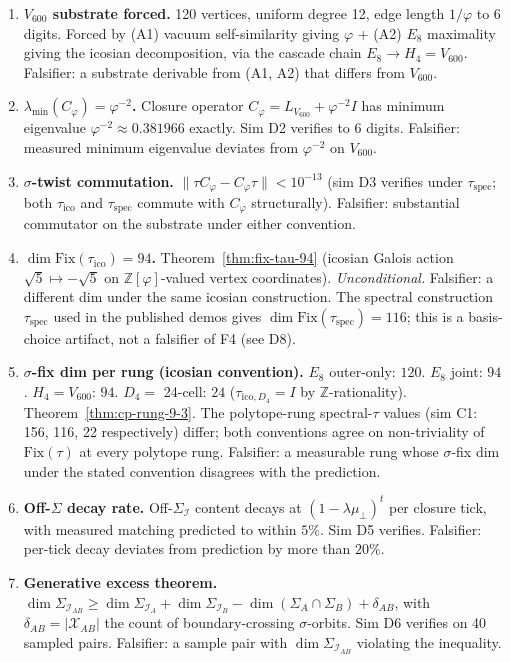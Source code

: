 \documentclass[11pt]{article}
\theoremstyle{plain}
\theoremstyle{definition}
\theoremstyle{remark}
\newcommand{\Zphi}{\mathbb{Z}[\varphi]}
\newcommand{\Ical}{\mathcal{I}}
\newcommand{\Fix}{\mathrm{Fix}}
\newcommand{\Cph}{C_\varphi}
\newcommand{\Xcal}{\mathcal{X}}
\begin{document}
\begin{enumerate}[leftmargin=2em, label=\textbf{F\arabic*.}]
\item \textbf{$V_{600}$ substrate forced.} 120 vertices, uniform degree 12, edge length $1/\varphi$ to 6 digits. Forced by (A1) vacuum self-similarity giving $\varphi$ + (A2) $E_8$ maximality giving the icosian decomposition, via the cascade chain $E_8 \to H_4 = V_{600}$. Falsifier: a substrate derivable from (A1, A2) that differs from $V_{600}$.
\item \textbf{$\lambda_{\min}(\Cph) = \varphi^{-2}$.} Closure operator $\Cph = L_{V_{600}} + \varphi^{-2} I$ has minimum eigenvalue $\varphi^{-2} \approx 0.381966$ exactly. Sim D2 verifies to 6 digits. Falsifier: measured minimum eigenvalue deviates from $\varphi^{-2}$ on $V_{600}$.
\item \textbf{$\sigma$-twist commutation.} $\|\tau \Cph - \Cph \tau\| < 10^{-13}$ (sim D3 verifies under $\tau_{\mathrm{spec}}$; both $\tau_{\mathrm{ico}}$ and $\tau_{\mathrm{spec}}$ commute with $\Cph$ structurally). Falsifier: substantial commutator on the substrate under either convention.
\item \textbf{$\dim \Fix(\tau_{\mathrm{ico}}) = 94$.} Theorem~\ref{thm:fix-tau-94} (icosian Galois action $\sqrt 5 \mapsto -\sqrt 5$ on $\Zphi$-valued vertex coordinates). \emph{Unconditional.} Falsifier: a different dim under the same icosian construction. The spectral construction $\tau_{\mathrm{spec}}$ used in the published demos gives $\dim \Fix(\tau_{\mathrm{spec}}) = 116$; this is a basis-choice artifact, not a falsifier of F4 (see D8).
\item \textbf{$\sigma$-fix dim per rung (icosian convention).} $E_8$ outer-only: $120$. $E_8$ joint: $94$. $H_4 = V_{600}$: $94$. $D_4 =$ 24-cell: $24$ ($\tau_{\mathrm{ico},D_4} = I$ by $\mathbb{Z}$-rationality). Theorem~\ref{thm:cp-rung-9-3}. The polytope-rung spectral-$\tau$ values (sim C1: 156, 116, 22 respectively) differ; both conventions agree on non-triviality of $\Fix(\tau)$ at every polytope rung. Falsifier: a measurable rung whose $\sigma$-fix dim under the stated convention disagrees with the prediction.
\item \textbf{Off-$\Sigma$ decay rate.} Off-$\Sigma_\Ical$ content decays at $(1 - \lambda \mu_\perp)^t$ per closure tick, with measured matching predicted to within $5\%$. Sim D5 verifies. Falsifier: per-tick decay deviates from prediction by more than $20\%$.
\item \textbf{Generative excess theorem.} $\dim \Sigma_{\Ical_{AB}} \geq \dim \Sigma_{\Ical_A} + \dim \Sigma_{\Ical_B} - \dim(\Sigma_A \cap \Sigma_B) + \delta_{AB}$, with $\delta_{AB} = |\Xcal_{AB}|$ the count of boundary-crossing $\sigma$-orbits. Sim D6 verifies on 40 sampled pairs. Falsifier: a sample pair with $\dim \Sigma_{\Ical_{AB}}$ violating the inequality.

\end{enumerate}
\end{document}
